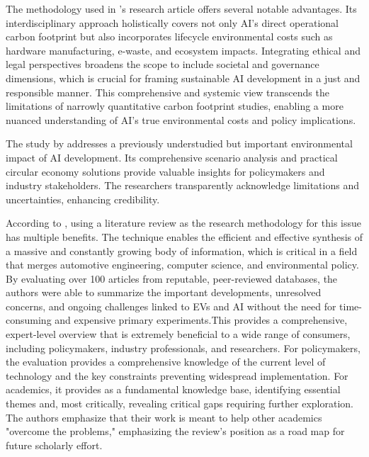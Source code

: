 \documentclass[a4paper, 12pt]{article}
\begin{document}
The methodology used in \citet{Zhuk2023}'s research article offers several notable advantages. Its interdisciplinary approach holistically covers not only AI's direct operational carbon footprint but also incorporates lifecycle environmental costs such as hardware manufacturing, e-waste, and ecosystem impacts. Integrating ethical and legal perspectives broadens the scope to include societal and governance dimensions, which is crucial for framing sustainable AI development in a just and responsible manner. This comprehensive and systemic view transcends the limitations of narrowly quantitative carbon footprint studies, enabling a more nuanced understanding of AI's true environmental costs and policy implications.\hfill \break

The study by \citet{wang_2024_ewaste} addresses a previously understudied but important environmental impact of AI development. Its comprehensive scenario analysis and practical circular economy solutions provide valuable insights for policymakers and industry stakeholders. The researchers transparently acknowledge limitations and uncertainties, enhancing credibility.\hfill \break

According to \citet{M.rauf2024}, using a literature review as the research methodology for this issue has multiple benefits.   The technique enables the efficient and effective synthesis of a massive and constantly growing body of information, which is critical in a field that merges automotive engineering, computer science, and environmental policy. By evaluating over 100 articles from reputable, peer-reviewed databases, the authors were able to summarize the important developments, unresolved concerns, and ongoing challenges linked to EVs and AI without the need for time-consuming and expensive primary experiments.This provides a comprehensive, expert-level overview that is extremely beneficial to a wide range of consumers, including policymakers, industry professionals, and researchers.  For policymakers, the evaluation provides a comprehensive knowledge of the current level of technology and the key constraints preventing widespread implementation.  For academics, it provides as a fundamental knowledge base, identifying essential themes and, most critically, revealing critical gaps requiring further exploration.  The authors emphasize that their work is meant to help other academics "overcome the problems," emphasizing the review's position as a road map for future scholarly effort.
\end{document}
